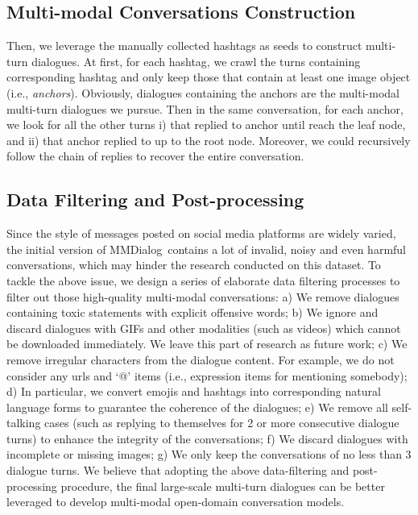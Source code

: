 \documentclass[11pt]{article}
\newcommand{\DataName}{MMDialog}
\begin{document}
\subsection{Multi-modal Conversations Construction}
Then, we leverage the manually collected hashtags as seeds to construct multi-turn dialogues. At first, for each hashtag, we crawl the turns containing corresponding hashtag and only keep those that contain at least one image object (i.e., \textit{anchors}). Obviously, dialogues containing the anchors are the multi-modal multi-turn dialogues we pursue. Then in the same conversation, for each anchor, we look for all the other turns i) that  replied to anchor until reach the leaf node, and ii) that  anchor replied to up to the root node. Moreover, we could recursively follow the chain of replies to recover the entire conversation.








\subsection{Data Filtering and Post-processing}
Since the style of messages posted on social media platforms are widely varied, the initial version of \DataName~contains a lot of invalid, noisy and even harmful conversations, which may hinder the research conducted on this dataset. To tackle the above issue, we design a series of elaborate data filtering processes to filter out those high-quality multi-modal conversations: a) We remove dialogues containing toxic statements with explicit offensive words; b) We ignore and discard dialogues with GIFs and other modalities (such as videos) which cannot be downloaded immediately. We leave this part of research as future work; c) We remove irregular characters from the dialogue content. For example, we do not consider any urls and `@' items (i.e., expression items for mentioning somebody); d) In particular, we convert emojis and hashtags into corresponding natural language forms  to guarantee the coherence of the dialogues;  e) We remove all  self-talking cases (such as replying to themselves for 2 or more consecutive dialogue turns) to enhance the integrity of the conversations;  f) We discard dialogues with incomplete or missing images; g) We only keep the conversations of no less than 3 dialogue turns. We believe that adopting the above data-filtering and post-processing procedure, the final large-scale multi-turn dialogues can be better leveraged  to develop multi-modal open-domain conversation models.
\end{document}
